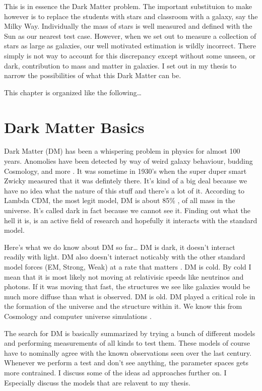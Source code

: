 This is in essence the Dark Matter problem.
The important substituion to make however is to replace the students with stars and classroom with a galaxy, say the Milky Way.
Individually the mass of stars is well measured and defined with the Sun as our nearest test case.
However, when we set out to measure a collection of stars as large as galaxies, our well motivated estimation is wildly incorrect.
There simply is not way to account for this discrepancy except without some unseen, or dark, contribution to mass and matter in galaxies.
I set out in my thesis to narrow the possibilities of what this Dark Matter can be.

This chapter is organized like the following\dots
{}

\section{Dark Matter Basics\label{sec:basicDM}}

Dark Matter (DM) has been a whispering problem in physics for almost 100 years.
Anomolies have been detected by way of weird galaxy behaviour, budding Cosmology, and more \ns.
It was sometime in 1930's when the super duper smart Zwicky measured that it was defintely there.
It's kind of a big deal because we have no idea what the nature of this stuff and there's a lot of it.
According to Lambda CDM, the most legit model, \ns DM is about 85\% \fu, of all mass in the universe.
It's called dark in fact because we cannot see it. \ns
Finding out what the hell it is, is an active field of research and hopefully it interacts with the standard model.

Here's what we do know about DM so far\dots
DM is dark, it doesn't interact readily with light.
DM also doesn't interact noticably with the other standard model forces (EM, Strong, Weak) at a rate that matters \ns.
DM is cold.
By cold I mean that it is most likely not moving at relativisic speeds like neutrinos and photons. \ns
If it was moving that fast, the structures we see like galaxies would be much more diffuse than what is observed. \ns
DM is old.
DM played a critical role in the formation of the universe and the structure within it. \ns
We know this from Cosmology and computer universe simulations \ns.

The search for DM is basically summarized by trying a bunch of different models and performing measurements of all kinds to test them.
These models of course have to nominally agree with the known observations seen over the last century.
Whenever we perform a test and don't see anything, the parameter spaces gets more contrained.
I discuss some of the ideas ad approaches further on.
I Especially discuss the models that are relavent to my thesis.

